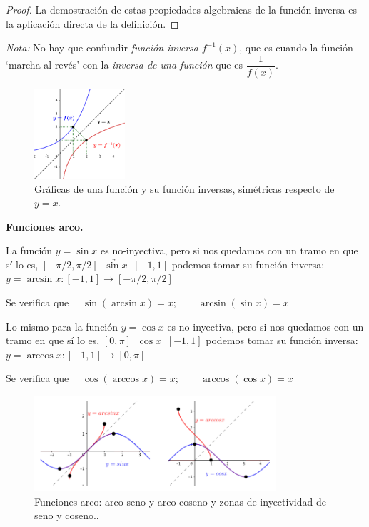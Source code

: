 		\begin{proof}
			La demostración de estas propiedades algebraicas de la función inversa es la aplicación directa de la definición.
		\end{proof}
		
		\emph{Nota:} No hay que confundir \emph{función inversa} $f^{-1}(x)$, que es cuando la función `marcha al revés'  con la \emph{inversa de una función} que es $\dfrac 1 {f(x)}$.
		

		\begin{figure}[H]
			\centering
			\includegraphics[width=0.3\textwidth]{imagenes/imagenes02/T02IM05.png}
			\caption{Gráficas de una función y su función inversas, simétricas respecto de $y=x$.}
		\end{figure}
		
		\textbf{Funciones arco.}
		
		 La función $y=\sin x$ es no-inyectiva, pero si nos quedamos con un tramo en que sí­ lo es, $[-\pi/2, \pi/2]  \; \;  \underrightarrow { \sin x } \; \;  [-1,1]$ podemos tomar su función inversa: $y=\arcsin x: [-1,1] \to [-\pi/2, \pi/2] $
		
		Se verifica que $\quad \sin (\arcsin x)=x; \qquad \arcsin (\sin x)=x$
		
		 Lo mismo para la función $y=\cos x$ es no-inyectiva, pero si nos quedamos con un tramo en que sí­ lo es, $[0, \pi]  \; \;  \underrightarrow { \cos x } \; \;  [-1,1]$ podemos tomar su función inversa: $y=\arccos x: [-1,1] \to [0, \pi] $
		
		Se verifica que $\quad \cos (\arccos x)=x; \qquad \arccos (\cos x)=x$
		
		
		
		\begin{figure}[H]
			\centering
			\includegraphics[width=0.8\textwidth]{imagenes/imagenes02/T02IM06.png}
			\caption{Funciones arco: arco seno y arco coseno y zonas de inyectividad de seno y coseno..}
		\end{figure}
		

